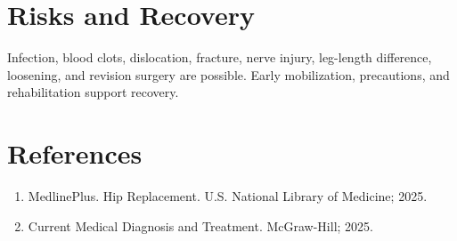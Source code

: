 \section*{Risks and Recovery}
Infection, blood clots, dislocation, fracture, nerve injury, leg-length difference, loosening, and revision surgery are possible. Early mobilization, precautions, and rehabilitation support recovery.

\section*{References}
\begin{enumerate}
  \item MedlinePlus. Hip Replacement. U.S. National Library of Medicine; 2025.
  \item Current Medical Diagnosis and Treatment. McGraw-Hill; 2025.
\end{enumerate}
\clearpage
